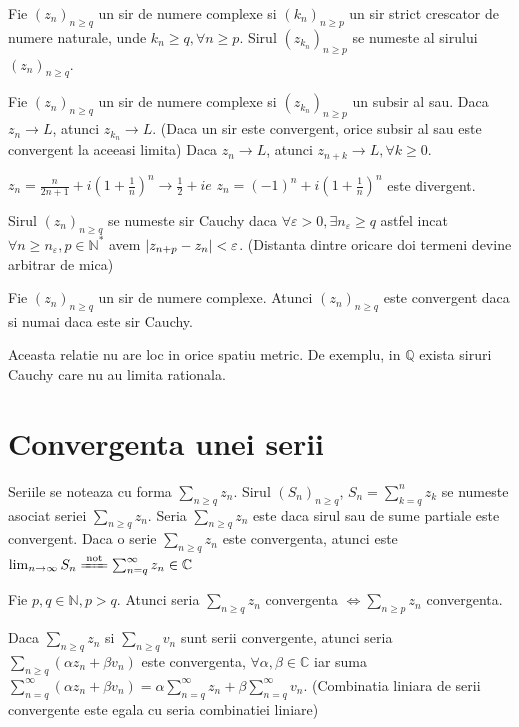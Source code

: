 \documentclass{article}
\begin{document}
\begin{enumerate}
 Fie $(z_n)_{n \geq q}$ un sir de numere complexe si $(k_n)_{n \geq p}$ un sir strict crescator de numere naturale, unde $k_n \geq q, \forall n \geq p$. Sirul $(z_{k_n})_{n \geq p}$ se numeste  al sirului $(z_n)_{n \geq q}$.

\propozitie Fie $(z_n)_{n \geq q}$ un sir de numere complexe si $(z_{k_n})_{n \geq p}$ un subsir al sau. Daca $z_n \to L$, atunci $z_{k_n} \to L$. (Daca un sir este convergent, orice subsir al sau este convergent la aceeasi limita)
\proprietate Daca $z_n \to L$, atunci $z_{n + k} \to L, \forall k \geq 0$.

\exemplu $z_n = \frac{n}{2n+1} + i\left(1+\frac{1}{n}\right)^n \to \frac{1}{2} + ie$
\exemplu $z_n = (-1)^n + i\left(1 + \frac{1}{n}\right)^n$ este divergent.



 Sirul $(z_n)_{n \geq q}$ se numeste sir Cauchy daca $\forall \varepsilon > 0, \exists n_{\varepsilon} \geq q$ astfel incat $\forall n \geq n_{\varepsilon}, p \in \mathbb{N}^*$ avem $\left\lvert z_{n+p} - z_n \right\rvert < \varepsilon$. (Distanta dintre oricare doi termeni devine arbitrar de mica)

\propozitie Fie $(z_n)_{n \geq q}$ un sir de numere complexe. Atunci $(z_n)_{n \geq q}$ este convergent daca si numai daca este sir Cauchy.

\observatie Aceasta relatie nu are loc in orice spatiu metric. De exemplu, in $\mathbb{Q}$ exista siruri Cauchy care nu au limita rationala.

\section{Convergenta unei serii}

\notatie Seriile se noteaza cu forma $\sum_{n \geq q} z_n$.
 Sirul $(S_n)_{n \geq q}$, $S_n = \sum_{k = q}^{n}z_{k}$ se numeste  asociat seriei $\sum_{n \geq q} z_n$.
 Seria $\sum_{n \geq q} z_n$ este  daca sirul sau de sume partiale este convergent.
 Daca o serie $\sum_{n \geq q} z_n$ este convergenta, atunci  este \\ $\lim_{n \to \infty} S_n \xlongequal{\text{not}} \sum_{n = q}^{\infty} z_n \in \mathbb{C}$


\proprietate Fie $p, q \in \mathbb{N}, p > q$. Atunci seria $\sum_{n \geq q} z_n$ convergenta $\Leftrightarrow \sum_{n \geq p} z_n$ convergenta.

\proprietate Daca $\sum_{n \geq q} z_n$ si $\sum_{n \geq q} v_n$ sunt serii convergente, atunci seria $\sum_{n \geq q} (\alpha z_n + \beta v_n)$ este convergenta, $\forall \alpha, \beta \in \mathbb{C}$ iar suma $\sum_{n = q}^{\infty} (\alpha z_n + \beta v_n) = \alpha \sum_{n = q}^{\infty}z_n + \beta \sum_{n = q}^{\infty}v_n$. (Combinatia liniara de serii convergente este egala cu seria combinatiei liniare)


\end{enumerate}
\end{document}
